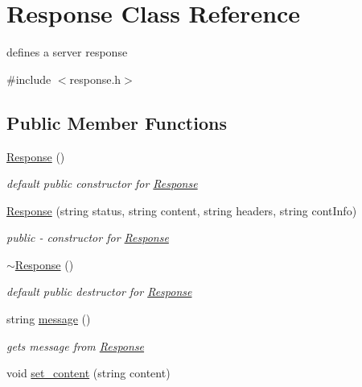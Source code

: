 \hypertarget{classResponse}{}\section{Response Class Reference}
\label{classResponse}


defines a server response  




{\ttfamily \#include $<$response.\+h$>$}

\subsection*{Public Member Functions}
\begin{DoxyCompactItemize}
\item 
\hyperlink{classResponse_aa9b6e391d77fce8daca8bac13730ec8e}{Response} ()\hypertarget{classResponse_aa9b6e391d77fce8daca8bac13730ec8e}{}\label{classResponse_aa9b6e391d77fce8daca8bac13730ec8e}

\begin{DoxyCompactList}\small\item\em default public constructor for \hyperlink{classResponse}{Response} \end{DoxyCompactList}\item 
\hyperlink{classResponse_a3ffc998b0ccf5e17e7a67160a073e739}{Response} (string status, string content, string headers, string cont\+Info)
\begin{DoxyCompactList}\small\item\em public -\/ constructor for \hyperlink{classResponse}{Response} \end{DoxyCompactList}\item 
\hyperlink{classResponse_a2a4a6403aaefce73725f17cf63896f84}{$\sim$\+Response} ()\hypertarget{classResponse_a2a4a6403aaefce73725f17cf63896f84}{}\label{classResponse_a2a4a6403aaefce73725f17cf63896f84}

\begin{DoxyCompactList}\small\item\em default public destructor for \hyperlink{classResponse}{Response} \end{DoxyCompactList}\item 
string \hyperlink{classResponse_a517690400a7b7091d03e917f335f7f28}{message} ()
\begin{DoxyCompactList}\small\item\em gets message from \hyperlink{classResponse}{Response} \end{DoxyCompactList}\item 
void \hyperlink{classResponse_ae2235d80909cf3bb4d3743525bdc9199}{set\+\_\+content} (string content)\hypertarget{classResponse_ae2235d80909cf3bb4d3743525bdc9199}{}\label{classResponse_ae2235d80909cf3bb4d3743525bdc9199}


\end{DoxyCompactItemize}
